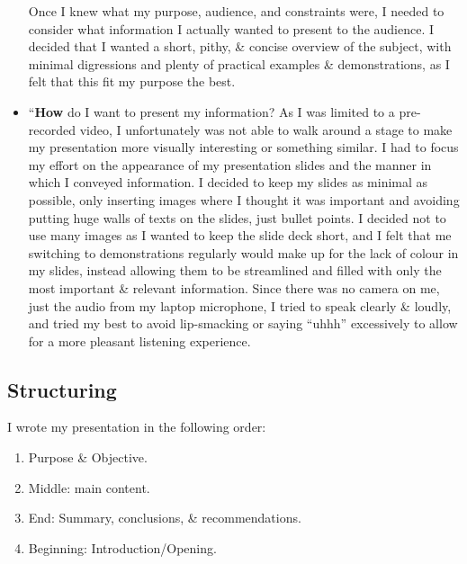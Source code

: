 \documentclass[a4paper]{article}
\begin{document}
\begin{itemize}
            Once I knew what my purpose, audience, and constraints were, I needed to consider what information I
            actually wanted to present to the audience.
            I decided that I wanted a short, pithy, \& concise overview of the subject, with minimal digressions and
            plenty of practical examples \& demonstrations, as I felt that this fit my purpose the best.
    \item   ``\textbf{How} do I want to present my information?
            As I was limited to a pre-recorded video, I unfortunately was not able to walk around a stage to make my
            presentation more visually interesting or something similar.
            I had to focus my effort on the appearance of my presentation slides and the manner in which I conveyed
            information.
            I decided to keep my slides as minimal as possible, only inserting images where I thought it was important
            and avoiding putting huge walls of texts on the slides, just bullet points.
            I decided not to use many images as I wanted to keep the slide deck short, and I felt that me switching to
            demonstrations regularly would make up for the lack of colour in my slides, instead allowing them to be
            streamlined and filled with only the most important \& relevant information.
            Since there was no camera on me, just the audio from my laptop microphone, I tried to speak clearly \&
            loudly, and tried my best to avoid lip-smacking or saying ``uhhh'' excessively to allow for a more pleasant
            listening experience.
\end{itemize}

\subsection{Structuring}
I wrote my presentation in the following order:
\begin{enumerate}
    \item   Purpose \& Objective.
    \item   Middle: main content.
    \item   End: Summary, conclusions, \& recommendations.
    \item   Beginning: Introduction/Opening.
\end{enumerate}
\end{document}
